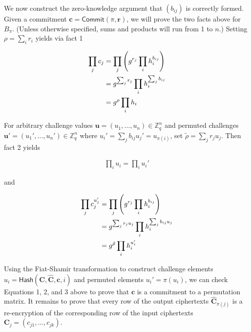 \documentclass[12pt,a4paper]{article}
\newcommand{\commit}{\mathsf{Commit}}
\theoremstyle{definition}
\begin{document}
We now construct the zero-knowledge argument that $(b_{ij})$ is correctly formed. Given a commitment $\mathbf{c}=\commit(\pi,\mathbf{r})$, we will prove the two facts above for $B_\pi$. (Unless otherwise specified, sums and products will run from 1 to $n$.) Setting $\rho = \sum_i r_i$ yields via fact 1

\begin{align}
\prod_j c_j &= \prod_j \left(g^{r_j}\prod_i h_i^{b_{ij}}\right)\notag\\
            &= g^{\sum_j r_j}\prod_i h_i^{\sum_j b_{ij}}\notag\\
            &= g^\rho\prod_i h_i \label{wikstrom-1}
\end{align}

For arbitrary challenge values $\mathbf{u}=(u_1, \ldots, u_n)\in\mathbb{Z}_q^n$ and permuted challenges $\mathbf{u'}=(u_1',\ldots,u_n')\in\mathbb{Z}_q^n$ where $u_i' = \sum_j b_{ij} u_j' = u_{\pi(i)}$, set $\tilde{\rho}=\sum_j r_j u_j$. Then fact 2 yields

\begin{align}
    \prod_i u_i = \prod_i u_i' \label{wikstrom-2}
\end{align}

and

\begin{align}
    \prod_j c_j^{u_j'}   &= \prod_j\left(g^{r_j}\prod_i h_i^{b_{ij}}\right)\notag\\    
                        &= g^{\sum_j r_j u_j}\prod_i h_i^{\sum_j b_{ij} u_j}\notag\\
                        &= g^{\tilde{\rho}} \prod_i h_i^{u_i'} \label{wikstrom-3}
\end{align}

Using the Fiat-Shamir transformation to construct challenge elements \\ $u_i=\mathsf{Hash}(\mathbf{C}, \mathbf{\hat{C}}, \mathbf{c}, i)$ and permuted elements $u_i'=\pi(u_i)$, we can check Equations 1, 2, and 3 above to prove that $\mathbf{c}$ is a commitment to a permutation matrix. It remains to prove that every row of the output ciphertexts $\mathbf{\hat{C}}_{\pi(j)}$ is a re-encryption of the corresponding row of the input ciphertexts $\mathbf{C}_j=(c_{j1},\ldots,c_{jk})$.
\end{document}
